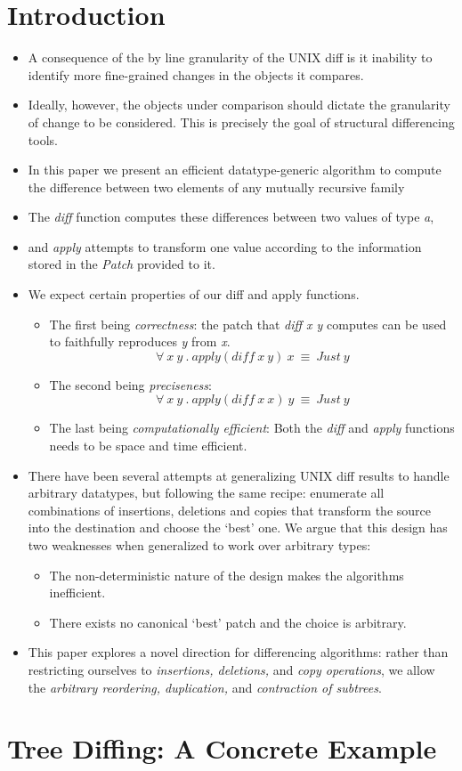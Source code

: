 \section{Introduction}
\begin{itemize}
    \item A consequence of the by line granularity of the UNIX diff is it inability to identify more fine-grained changes in the objects it compares.
    \item Ideally, however, the objects under comparison should dictate the granularity of change to be considered. This is precisely the goal of structural differencing tools.
    \item In this paper we present an efficient datatype-generic algorithm to compute the difference between two elements of any mutually recursive family
    \item The \textit{diff} function computes these differences between two values of type \textit{a}, 
    \item and \textit{apply} attempts to transform one value according to the information stored in the
    \textit{Patch} provided to it.
    \item We expect certain properties of our diff and apply functions.
    \begin{itemize}
        \item The first being \textit{correctness}: the patch that \textit{diff x y} computes can be used to faithfully reproduces \textit{y} from \textit{x}.
        \[
            \forall \: x \: y \: . \: apply (diff \: x \: y) \: x \: \equiv \: Just \: y
        \]
        \item The second being \textit{preciseness}:
        \[
            \forall \: x \: y \: . \: apply (diff \: x \: x) \: y \: \equiv \: Just \: y
        \]
        \item The last being \textit{computationally efficient}: Both the \textit{diff} and \textit{apply} functions needs to be space and time efficient.
    \end{itemize}
    \item There have been several attempts at generalizing UNIX diff results to handle arbitrary datatypes, but following the same recipe: enumerate all combinations of insertions, deletions and copies that transform the source into the destination and choose the ‘best’ one. We argue that this design has two weaknesses when generalized to work over arbitrary types:
    \begin{itemize}
        \item The non-deterministic nature of the design makes the algorithms inefficient.
        \item There exists no canonical ‘best’ patch and the choice is arbitrary.
    \end{itemize}
    \item This paper explores a novel direction for differencing algorithms: rather than restricting ourselves to \textit{insertions, deletions,} and \textit{copy operations}, we allow the \textit{arbitrary reordering, duplication,} and \textit{contraction of subtrees}.
\end{itemize}

\section{Tree Diffing: A Concrete Example}